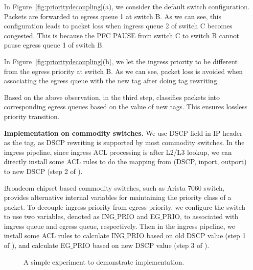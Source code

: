 In Figure~\ref{fig:prioritydecoupling}(a), we consider the default switch configuration. Packets are forwarded to egress queue 1 at switch B. As we can see, this configuration leads to packet loss when ingress queue 2 of switch C becomes congested. This is because the PFC PAUSE from switch C to switch B cannot pause  egress queue 1 of switch B. 
 
 In Figure~\ref{fig:prioritydecoupling}(b), we let the ingress priority to be different from the egress priority at switch B. As we can see, packet loss is avoided when associating the egress queue with the new tag after doing tag rewriting.
 
 Based on the above observation, in the third step, \sysname{} classifies packets into corresponding egress queues based on the value of new tags. This ensures lossless priority transition.
 
 \textbf{\sysname{} Implementation on commodity switches.} We use DSCP field in IP header as the tag, as DSCP rewriting is supported by most commodity switches. In the ingress pipeline, since ingress ACL processing is after L2/L3 lookup, we can directly install some ACL rules to do the mapping from (DSCP, inport, outport) to new DSCP (step 2 of \sysname{}).
 
 Broadcom chipset based commodity switches, such as Arista 7060 switch, provides alternative internal variables for maintaining the priority class of a packet. To decouple ingress priority from  egress priority, we configure the switch to use two variables, denoted as ING$\_$PRIO and EG$\_$PRIO, to associated with ingress queue and egress queue, respectively. Then in the ingress pipeline, we install some ACL rules to calculate ING$\_$PRIO based on old DSCP value (step 1 of \sysname{}), and calculate EG$\_$PRIO based on new DSCP value (step 3 of \sysname{}).
  

\begin{figure}[t]
	\centering
	
	
	\caption{A simple experiment to demonstrate  \sysname{} implementation.}\label{fig:tagger_demon}
\end{figure}


